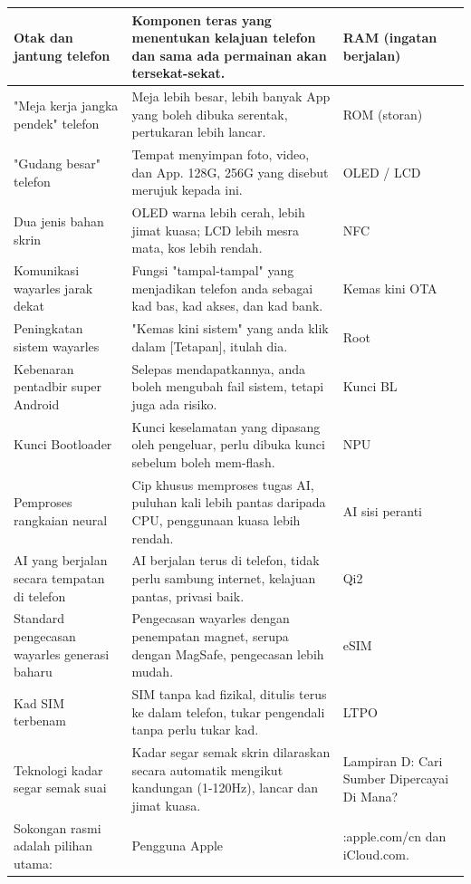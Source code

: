 
\begin{center}
\begin{tabularx}{\linewidth}{|X|X|X|}
\hline
\textbf{Otak dan jantung telefon} & \textbf{Komponen teras yang menentukan kelajuan telefon dan sama ada permainan akan tersekat-sekat.} & \textbf{RAM (ingatan berjalan)} \tabularnewline
\hline
"Meja kerja jangka pendek" telefon & Meja lebih besar, lebih banyak App yang boleh dibuka serentak, pertukaran lebih lancar. & ROM (storan) \tabularnewline
"Gudang besar" telefon & Tempat menyimpan foto, video, dan App. 128G, 256G yang disebut merujuk kepada ini. & OLED / LCD \tabularnewline
Dua jenis bahan skrin & OLED warna lebih cerah, lebih jimat kuasa; LCD lebih mesra mata, kos lebih rendah. & NFC \tabularnewline
Komunikasi wayarles jarak dekat & Fungsi "tampal-tampal" yang menjadikan telefon anda sebagai kad bas, kad akses, dan kad bank. & Kemas kini OTA \tabularnewline
Peningkatan sistem wayarles & "Kemas kini sistem" yang anda klik dalam [Tetapan], itulah dia. & Root \tabularnewline
Kebenaran pentadbir super Android & Selepas mendapatkannya, anda boleh mengubah fail sistem, tetapi juga ada risiko. & Kunci BL \tabularnewline
Kunci Bootloader & Kunci keselamatan yang dipasang oleh pengeluar, perlu dibuka kunci sebelum boleh mem-flash. & NPU \tabularnewline
Pemproses rangkaian neural & Cip khusus memproses tugas AI, puluhan kali lebih pantas daripada CPU, penggunaan kuasa lebih rendah. & AI sisi peranti \tabularnewline
AI yang berjalan secara tempatan di telefon & AI berjalan terus di telefon, tidak perlu sambung internet, kelajuan pantas, privasi baik. & Qi2 \tabularnewline
Standard pengecasan wayarles generasi baharu & Pengecasan wayarles dengan penempatan magnet, serupa dengan MagSafe, pengecasan lebih mudah. & eSIM \tabularnewline
Kad SIM terbenam & SIM tanpa kad fizikal, ditulis terus ke dalam telefon, tukar pengendali tanpa perlu tukar kad. & LTPO \tabularnewline
Teknologi kadar segar semak suai & Kadar segar semak skrin dilaraskan secara automatik mengikut kandungan (1-120Hz), lancar dan jimat kuasa. & Lampiran D: Cari Sumber Dipercayai Di Mana? \tabularnewline
Sokongan rasmi adalah pilihan utama: & Pengguna Apple & :apple.com/cn dan iCloud.com. \tabularnewline
\hline
\end{tabularx}
\end{center}
